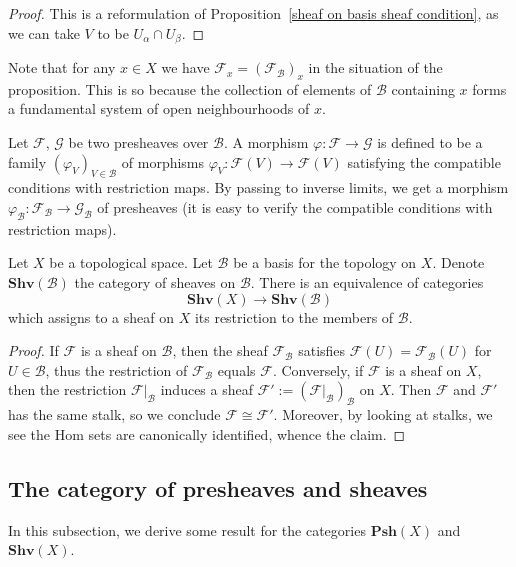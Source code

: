 \begin{proof}
This is a reformulation of Proposition~\ref{sheaf on basis sheaf condition}, as we can take $V$ to be $U_\alpha\cap U_\beta$.
\end{proof}
Note that for any $x\in X$ we have $\mathscr{F}_x=(\mathscr{F}_{\mathcal{B}})_x$ in the situation of the proposition. This is so because the collection of elements of $\mathcal{B}$ containing $x$ forms a fundamental system of open neighbourhoods of $x$.\par
Let $\mathscr{F}$, $\mathscr{G}$ be two presheaves over $\mathcal{B}$. A morphism $\varphi:\mathscr{F}\to\mathscr{G}$ is defined to be a family $(\varphi_V)_{V\in\mathcal{B}}$ of morphisms $\varphi_V:\mathscr{F}(V)\to\mathscr{F}(V)$ satisfying the compatible conditions with restriction maps. By passing to inverse limits, we get a morphism $\varphi_{\mathcal{B}}:\mathscr{F}_{\mathcal{B}}\to\mathscr{G}_{\mathcal{B}}$ of presheaves (it is easy to verify the compatible conditions with restriction maps).
\begin{theorem}
Let $X$ be a topological space. Let $\mathcal{B}$ be a basis for the topology on $X$. Denote $\mathbf{Shv}(\mathcal{B})$ the category of sheaves on $\mathcal{B}$. There is an equivalence of categories
\[\mathbf{Shv}(X)\to\mathbf{Shv}(\mathcal{B})\]
which assigns to a sheaf on $X$ its restriction to the members of $\mathcal{B}$.
\end{theorem}
\begin{proof}
If $\mathscr{F}$ is a sheaf on $\mathcal{B}$, then the sheaf $\mathscr{F}_{\mathcal{B}}$ satisfies $\mathscr{F}(U)=\mathscr{F}_{\mathcal{B}}(U)$ for $U\in\mathcal{B}$, thus the restriction of $\mathscr{F}_{\mathcal{B}}$ equals $\mathscr{F}$. Conversely, if $\mathscr{F}$ is a sheaf on $X$, then the restriction $\mathscr{F}|_{\mathcal{B}}$ induces a sheaf $\mathscr{F}':=(\mathscr{F}|_{\mathcal{B}})_{\mathcal{B}}$ on $X$. Then $\mathscr{F}$ and $\mathscr{F}'$ has the same stalk, so we conclude $\mathscr{F}\cong\mathscr{F}'$. Moreover, by looking at stalks, we see the Hom sets are canonically identified, whence the claim.
\end{proof}
\subsection{The category of presheaves and sheaves}
In this subsection, we derive some result for the categories $\mathbf{Psh}(X)$ and $\mathbf{Shv}(X)$.

